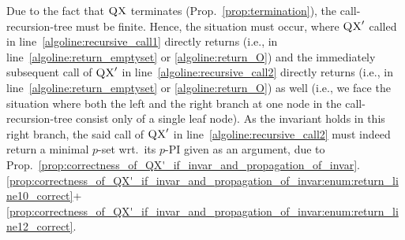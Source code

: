 \documentclass[]{elsarticle}
\newcommand{\scQX}{{\textsc{QX}}}
\begin{document}
	Due to the fact that $\scQX$ terminates (Prop.~\ref{prop:termination}), the call-recursion-tree must be finite. Hence, the situation must occur, where $\scQX'$ called in line~\ref{algoline:recursive_call1} directly returns (i.e., in line~\ref{algoline:return_emptyset} or \ref{algoline:return_O}) and the immediately subsequent call of $\scQX'$ in line~\ref{algoline:recursive_call2} directly returns (i.e., in line~\ref{algoline:return_emptyset} or \ref{algoline:return_O}) as well (i.e., we face the situation where both the left and the right branch at one node in the call-recursion-tree consist only of a single leaf node). As the invariant holds in this right branch, the said call of $\scQX'$ in line~\ref{algoline:recursive_call2} must indeed return a minimal $p$-set wrt.\ its $p$-PI given as an argument, due to Prop.~\ref{prop:correctness_of_QX'_if_invar_and_propagation_of_invar}.\ref{prop:correctness_of_QX'_if_invar_and_propagation_of_invar:enum:return_line10_correct}+\ref{prop:correctness_of_QX'_if_invar_and_propagation_of_invar:enum:return_line12_correct}.
	
\end{document}
